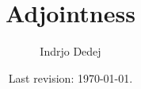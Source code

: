 




\title{Adjointness}
\author{Indrjo Dedej}
\date{Last revision: \today{}.}



\maketitle

\tableofcontents

%








